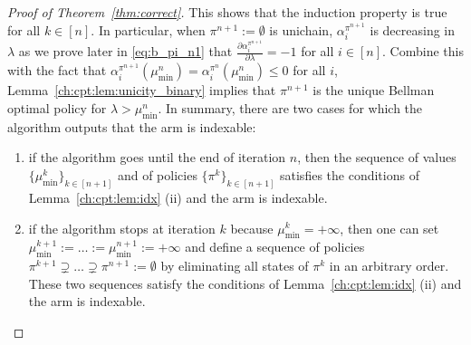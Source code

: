 \begin{proof}[Proof of Theorem~\ref{thm:correct}]
    This shows that the induction property is true for all $k\in[n]$.
    In particular, when $\pi^{n+1}:=\emptyset$ is unichain, $\alpha^{\pi^{n+1}}_i$ is decreasing in $\lambda$ as we prove later in \eqref{eq:b_pi_n1} that $\frac{\partial \alpha^{\pi^{n+1}}_i}{\partial \lambda} =-1$ for all $i\in[n]$.
    Combine this with the fact that $\alpha^{\pi^{n+1}}_i(\mu^{n}_{\min}) =\alpha^{\pi^{n}}_i(\mu^{n}_{\min})\le0$ for all $i$, Lemma~\ref{ch:cpt:lem:unicity_binary} implies that $\pi^{n+1}$ is the unique Bellman optimal policy for $\lambda>\mu^n_{\min}$.
    In summary, there are two cases for which the algorithm outputs that the arm is indexable:
    \begin{enumerate}
        \item if the algorithm goes until the end of iteration $n$, then the sequence of values $\{\mu^k_{\min}\}_{k\in[n+1]}$ and of policies $\{\pi^k\}_{k\in[n+1]}$ satisfies the conditions of Lemma~\ref{ch:cpt:lem:idx} (ii) and the arm is indexable.
        \item if the algorithm stops at iteration $k$ because $\mu^k_{\min}=+\infty$, then one can set $\mu^{k+1}_{\min}:=\dots:=\mu^{n+1}_{\min}:=+\infty$ and define a sequence of policies $\pi^{k+1}\supsetneq\dots\supsetneq\pi^{n+1}:=\emptyset$ by eliminating all states of $\pi^k$ in an arbitrary order. These two sequences satisfy the conditions of Lemma~\ref{ch:cpt:lem:idx} (ii) and the arm is indexable.
    \end{enumerate}
    
    \medskip


\end{proof}
